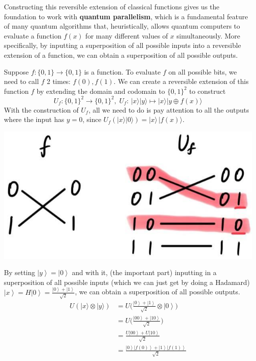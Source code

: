 \documentclass{article}
\newcommand{\ket}[1]{\ensuremath{\left|#1\right\rangle}}
\begin{document}
    Constructing this reversible extension of classical functions gives us the foundation to work with \textbf{quantum parallelism}, which is a fundamental feature of many quantum algorithms that, heuristically, allows quantum computers to evaluate a function $f(x)$ for many different values of $x$ simultaneously. More specifically, by inputting a superposition of all possible inputs into a reversible extension of a function, we can obtain a superposition of all possible outputs. 

    \begin{example}
      Suppose $f: \{0, 1\} \longrightarrow \{0, 1\}$ is a function. To evaluate $f$ on all possible bits, we need to call $f$ 2 times: $f(0), f(1)$. We can create a reversible extension of this function $f$ by extending the domain and codomain to $\{0, 1\}^2$ to construct
      \begin{equation} 
        U_f: \{0, 1\}^2 \longrightarrow \{0, 1\}^2, \; U_f: \, |x \rangle |y\rangle \mapsto |x\rangle |y \oplus f(x) \rangle
      \end{equation}
      With the construction of $U_f$, all we need to do is pay attention to all the outputs where the input has $y=0$, since $U_f (|x \rangle |0\rangle) = |x \rangle \, |f(x) \rangle$.
      \begin{center}
        \includegraphics[scale=0.3]{img/f_to_U_one_qubit_reversible.jpg}
      \end{center}
      By setting $\ket{y} = \ket{0}$ and with it, (the important part) inputting in a superposition of all possible inputs (which we can just get by doing a Hadamard) $\ket{x} = H \ket{0} = \frac{\ket{0} + \ket{1}}{\sqrt{2}}$, we can obtain a superposition of all possible outputs.
      \begin{align*}
        U (|x\rangle \otimes |y\rangle) & = U \bigg(\frac{\ket{0} + \ket{1}}{\sqrt{2}} \otimes \ket{0} \bigg) \\ 
                                        & = U \bigg( \frac{\ket{00} + \ket{10}}{\sqrt{2}} \bigg) \\ 
                                        & = \frac{U \ket{00} + U \ket{10}}{\sqrt{2}} \\ 
                                        & = \frac{\ket{0} \ket{f(0)} + \ket{1} \ket{f(1)}}{\sqrt{2}}
      \end{align*}


\end{example}
\end{document}
